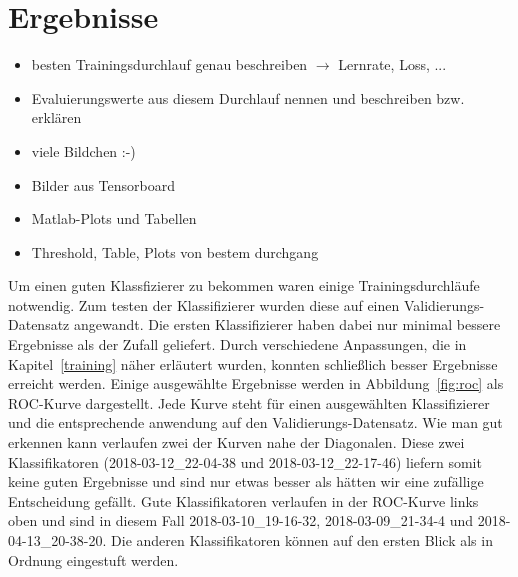 \section{Ergebnisse}
\color{red}
\begin{itemize}
	\item besten Trainingsdurchlauf genau beschreiben $\rightarrow$ Lernrate, Loss, ...
	\item Evaluierungswerte aus diesem Durchlauf nennen und beschreiben bzw. erklären
	\item viele Bildchen :-) 
	\item Bilder aus Tensorboard
	\item Matlab-Plots und Tabellen 
    \item Threshold, Table, Plots von bestem durchgang
\end{itemize}
\color{black}

Um einen guten Klassfizierer zu bekommen waren einige Trainingsdurchläufe notwendig. Zum testen der Klassifizierer wurden diese auf einen Validierungs-Datensatz angewandt. Die ersten Klassifizierer haben dabei nur minimal bessere Ergebnisse als der Zufall geliefert. Durch verschiedene Anpassungen, die in Kapitel~\ref{training} näher erläutert wurden, konnten schließlich besser Ergebnisse erreicht werden. Einige ausgewählte Ergebnisse werden in Abbildung~\ref{fig:roc} als ROC-Kurve dargestellt. Jede Kurve steht für einen ausgewählten Klassifizierer und die entsprechende anwendung auf den Validierungs-Datensatz. Wie man gut erkennen kann verlaufen zwei der Kurven nahe der Diagonalen. Diese zwei Klassifikatoren (2018-03-12\_22-04-38 und 2018-03-12\_22-17-46) liefern somit keine guten Ergebnisse und sind nur etwas besser als hätten wir eine zufällige Entscheidung gefällt. Gute Klassifikatoren verlaufen in der ROC-Kurve links oben und sind in diesem Fall 2018-03-10\_19-16-32, 2018-03-09\_21-34-4 und 2018-04-13\_20-38-20. Die anderen Klassifikatoren können auf den ersten Blick als in Ordnung eingestuft werden.

